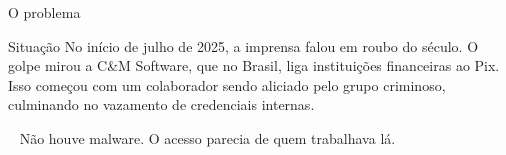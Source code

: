 \begin{frame}{O problema}
  \begin{cefetalertblock}{Situação}
    \small
    No início de julho de 2025, a imprensa falou em roubo do século.
    O golpe mirou a C\&M Software, que no Brasil, liga instituições financeiras ao Pix.
    Isso começou com um colaborador sendo aliciado pelo grupo criminoso, culminando no vazamento de credenciais internas.
  \end{cefetalertblock}
  \vspace{0.4em}
  {\scriptsize\color{cefetAccent}\faArrowRight\ %
  \color{cefetMuted}Não houve malware. O acesso parecia de quem trabalhava lá.\par}
\end{frame}
